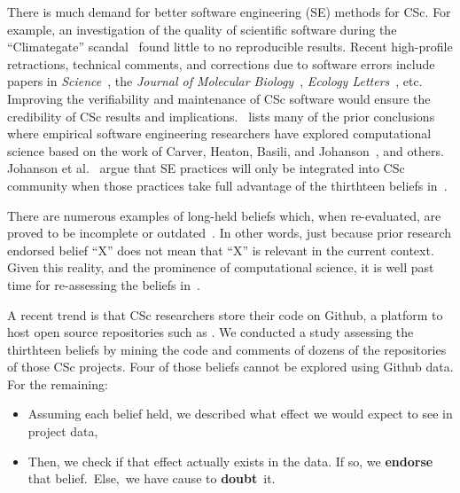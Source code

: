 \documentclass[conference,10pt]{IEEEtran}
\newcommand{\bi}{\begin{itemize}}
\newcommand{\ei}{\end{itemize}}
\begin{document}
There is much demand for better software engineering (SE) methods
for CSc. For example, an investigation of the 
quality of scientific software during the ``Climategate'' scandal~\cite{merali10_error} found little to no reproducible results. Recent high-profile retractions, technical comments, and corrections
due to software errors include papers in \textit{Science}~\cite{Chang1875_science, comments_science}, the \textit{Journal of Molecular Biology}~\cite{Geoffrey_JMB}, \textit{Ecology Letters}~\cite{lee_ecolet, david_ecolet}, etc. Improving the verifiability and maintenance of CSc software would ensure the credibility of CSc results and implications.~
lists many of the prior conclusions
where empirical software
engineering researchers have explored computational science  based on the work of
Carver, Heaton, Basili, and Johanson~\cite{carver13_perception, carver07_environment, basili08_hpc, heaton15_lit, johan18_secs}, and others.
Johanson et al.~\cite{johan18_secs}   argue that SE practices will only be integrated into CSc community when
those practices take full advantage of
the   thirthteen beliefs  in~. 
 



There are numerous examples of long-held beliefs which, when re-evaluated, are proved to be incomplete or outdated~\cite{menzies17,dev16}. In other words, just because  prior research endorsed
 belief ``X'' does not mean that ``X'' is relevant in the current context. Given this reality, and the prominence of 
computational science, it is 
well past time for re-assessing the beliefs in~. 

A recent trend is that CSc researchers store their code on Github, a platform to host open source repositories such as  \cite{kendall05_C, BangerthHartmannKanschat2007, lammps-sandia, deelman-fgcs-2015}.
We conducted a study assessing the thirthteen beliefs by mining the code and comments of dozens of the repositories of  those CSc projects. Four of those beliefs cannot be explored using Github data. For the remaining:
\bi
\item Assuming each belief held,
we described what effect we would expect to see in project data,
\item Then, we check if that effect actually exists in the data.
If so,\hspace{-1pt} we \textbf{endorse} that belief.~Else,~we have cause to  \textbf{doubt}~it. 
\ei
\end{document}
